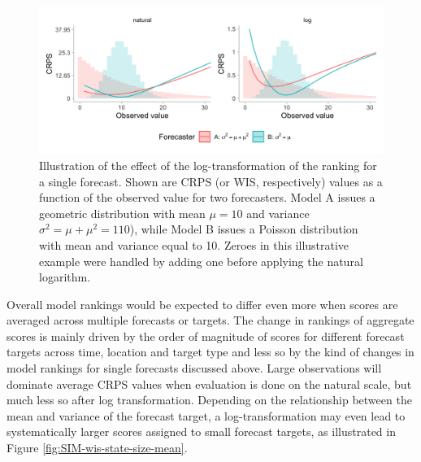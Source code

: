 \documentclass{article}
\begin{document}
\begin{figure}[h!]
\centering
\includegraphics[width = 1\textwidth]{output/figures/illustration-effect-log-ranking-crps.png}
\caption{Illustration of the effect of the log-transformation of the ranking for a single forecast. Shown are CRPS (or WIS, respectively) values as a function of the observed value for two forecasters. Model A issues a geometric distribution with mean $\mu = 10$ and variance $\sigma^2 = \mu + \mu^2 = 110$), while Model B issues a Poisson distribution with mean and variance equal to 10. Zeroes in this illustrative example were handled by adding one before applying the natural logarithm.}
\label{fig:illustration-ranking}
\end{figure}

Overall model rankings would be expected to differ even more when scores are averaged across multiple forecasts or targets. The change in rankings of aggregate scores is mainly driven by the order of magnitude of scores for different forecast targets across time, location and target type and less so by the kind of changes in model rankings for single forecasts discussed above. Large observations will dominate average CRPS values when evaluation is done on the natural scale, but much less so after log transformation. Depending on the relationship between the mean and variance of the forecast target, a log-transformation may even lead to systematically larger scores assigned to small forecast targets, as illustrated in Figure \ref{fig:SIM-wis-state-size-mean}. 


\end{document}
